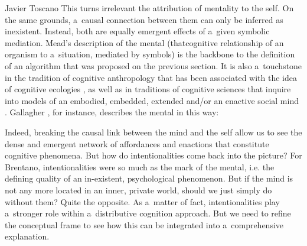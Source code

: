\begin{artengenv}{Javier Toscano}
This turns irrelevant the attribution of mentality to the self. On the same grounds, a~causal connection between them can only be inferred as inexistent. Instead, both are equally emergent effects of a~given symbolic mediation. Mead's description of the mental (thatcognitive relationship of an organism to a~situation, mediated by symbols) is the backbone to the definition of an algorithm that was proposed on the previous section. It is also a~touchstone in the tradition of cognitive anthropology that has been associated with the idea of cognitive ecologies
\parencites[][]{douglas_how_1986}[][]{lave_cognition_1988}[][]{connerton_how_1989}[][]{hutchins_cognition_1995}[][]{hutchins_cognitive_2010}, %
 as well as in traditions of cognitive sciences that inquire into models of an embodied, embedded, extended and/or an enactive social mind 
\parencites[][]{clark_being_1997}[][]{clark_natural-born_2003}[][]{clark_what_2015}[][]{clark_extended_1998}[][]{gallagher_how_2005}[][]{gallagher_socially_2013}[][]{gallagher_neo-pragmatism_2012}. %
 Gallagher 
\parencite*[][p.4]{gallagher_socially_2013}, %
 for instance, describes the mental in this way:

Indeed, breaking the causal link between the mind and the self allow us to see the dense and emergent network of affordances and enactions that constitute cognitive phenomena. But how do intentionalities come back into the picture? For Brentano, intentionalities were so much as the mark of the mental, i.e. the defining quality of an in-existent, psychological phenomenon. But if the mind is not any more located in an inner, private world, should we just simply do without them? Quite the opposite. As a~matter of fact, intentionalities play a~stronger role within a~distributive cognition approach. But we need to refine the conceptual frame to see how this can be integrated into a~comprehensive explanation.


\end{artengenv}
